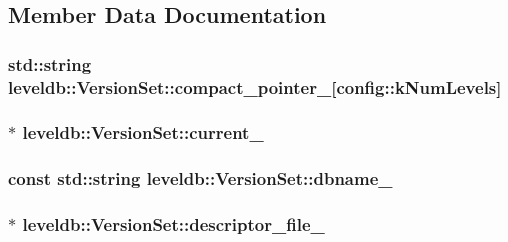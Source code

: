 \subsection{Member Data Documentation}
\hypertarget{classleveldb_1_1_version_set_ac5b2015d9ea267679a5c0ccbc177a846}{
\subsubsection[{compact\-\_\-pointer\-\_\-}]{\setlength{\rightskip}{0pt plus 5cm}std\-::string leveldb\-::\-Version\-Set\-::compact\-\_\-pointer\-\_\-\mbox{[}{\bf config\-::k\-Num\-Levels}\mbox{]}\hspace{0.3cm}{\ttfamily [private]}}}\label{classleveldb_1_1_version_set_ac5b2015d9ea267679a5c0ccbc177a846}
\hypertarget{classleveldb_1_1_version_set_ac008aa680d0ce8de93158a46bf419d3d}{
\subsubsection[{current\-\_\-}]{$\ast$ leveldb\-::\-Version\-Set\-::current\-\_\-\hspace{0.3cm}{\ttfamily [private]}}}\label{classleveldb_1_1_version_set_ac008aa680d0ce8de93158a46bf419d3d}
\hypertarget{classleveldb_1_1_version_set_ab52bd63a816220ba031937e291ef2be5}{
\subsubsection[{dbname\-\_\-}]{\setlength{\rightskip}{0pt plus 5cm}const std\-::string leveldb\-::\-Version\-Set\-::dbname\-\_\-\hspace{0.3cm}{\ttfamily [private]}}}\label{classleveldb_1_1_version_set_ab52bd63a816220ba031937e291ef2be5}
\hypertarget{classleveldb_1_1_version_set_a8f3566876dcd58e6f19e41e2f21bf6f7}{
\subsubsection[{descriptor\-\_\-file\-\_\-}]{$\ast$ leveldb\-::\-Version\-Set\-::descriptor\-\_\-file\-\_\-\hspace{0.3cm}{\ttfamily [private]}}}\label{classleveldb_1_1_version_set_a8f3566876dcd58e6f19e41e2f21bf6f7}
